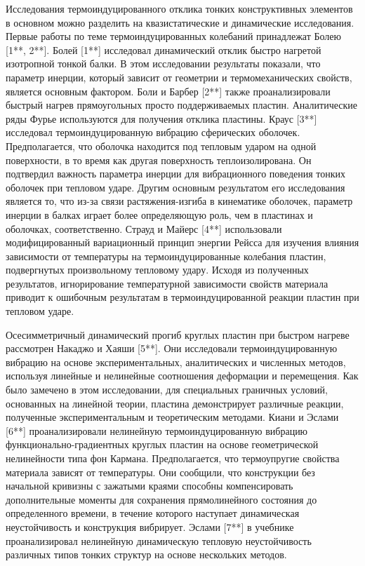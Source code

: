 Исследования термоиндуцированного отклика тонких конструктивных элементов в основном можно разделить на квазистатические и динамические исследования. Первые работы по теме термоиндуцированных колебаний принадлежат Болею [1**, 2**]. Болей [1**] исследовал динамический отклик быстро нагретой изотропной тонкой балки. В этом исследовании результаты показали, что параметр инерции, который зависит от геометрии и термомеханических свойств, является основным фактором. Боли и Барбер [2**] также проанализировали быстрый нагрев прямоугольных просто поддерживаемых пластин. Аналитические ряды Фурье используются для получения отклика пластины. Краус [3**] исследовал термоиндуцированную вибрацию сферических оболочек. Предполагается, что оболочка находится под тепловым ударом на одной поверхности, в то время как другая поверхность теплоизолирована. Он подтвердил важность параметра инерции для вибрационного поведения тонких оболочек при тепловом ударе.  Другим основным результатом его исследования является то, что из-за связи растяжения-изгиба в кинематике оболочек, параметр инерции в балках играет более определяющую роль, чем в пластинах и оболочках, соответственно. Страуд и Майерс [4**] использовали модифицированный вариационный принцип энергии Рейсса для изучения влияния зависимости от температуры на термоиндуцированные колебания пластин, подвергнутых произвольному тепловому удару. Исходя из полученных результатов, игнорирование температурной зависимости свойств материала приводит к ошибочным результатам в термоиндуцированной реакции пластин при тепловом ударе.


Осесимметричный динамический прогиб круглых пластин при быстром нагреве рассмотрен Накаджо и Хаяши [5**]. Они исследовали термоиндуцированную вибрацию на основе экспериментальных, аналитических и численных методов, используя линейные и нелинейные соотношения деформации и перемещения. Как было замечено в этом исследовании, для специальных граничных условий, основанных на линейной теории, пластина демонстрирует различные реакции, полученные экспериментальным и теоретическим методами. Киани и Эслами [6**] проанализировали нелинейную термоиндуцированную вибрацию функционально-градиентных круглых пластин на основе геометрической нелинейности типа фон Кармана. Предполагается, что термоупругие свойства материала зависят от температуры. Они сообщили, что конструкции без начальной кривизны с зажатыми краями способны компенсировать дополнительные моменты для сохранения прямолинейного состояния до определенного времени, в течение которого наступает динамическая неустойчивость и конструкция вибрирует. Эслами [7**] в учебнике проанализировал нелинейную динамическую тепловую неустойчивость различных типов тонких структур на основе нескольких методов.


